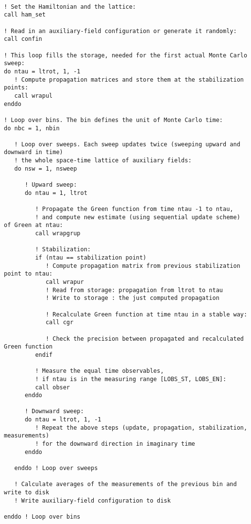 \lstset{style=fortran_pseudo_code}
\begin{lstlisting}

! Set the Hamiltonian and the lattice:
call ham_set

! Read in an auxiliary-field configuration or generate it randomly:
call confin

! This loop fills the storage, needed for the first actual Monte Carlo sweep:
do ntau = ltrot, 1, -1 
   ! Compute propagation matrices and store them at the stabilization points:
   call wrapul 
enddo

! Loop over bins. The bin defines the unit of Monte Carlo time:
do nbc = 1, nbin 

   ! Loop over sweeps. Each sweep updates twice (sweeping upward and downward in time)
   ! the whole space-time lattice of auxiliary fields:
   do nsw = 1, nsweep 
   
      ! Upward sweep:
      do ntau = 1, ltrot
      
         ! Propagate the Green function from time ntau -1 to ntau, 
         ! and compute new estimate (using sequential update scheme) of Green at ntau: 
         call wrapgrup
         
         ! Stabilization:      
         if (ntau == stabilization point)
            ! Compute propagation matrix from previous stabilization point to ntau: 
            call wrapur
            ! Read from storage: propagation from ltrot to ntau
            ! Write to storage : the just computed propagation 
                        
            ! Recalculate Green function at time ntau in a stable way:
            call cgr
            
            ! Check the precision between propagated and recalculated Green function
         endif
        
         ! Measure the equal time observables, 
         ! if ntau is in the measuring range [LOBS_ST, LOBS_EN]:
         call obser
      enddo
      
      ! Downward sweep:
      do ntau = ltrot, 1, -1
         ! Repeat the above steps (update, propagation, stabilization, measurements) 
         ! for the downward direction in imaginary time
      enddo
      
   enddo ! Loop over sweeps
    
   ! Calculate averages of the measurements of the previous bin and write to disk
   ! Write auxiliary-field configuration to disk
   
enddo ! Loop over bins        

\end{lstlisting}
